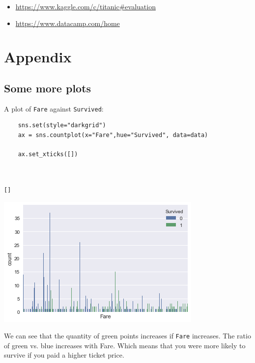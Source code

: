 \documentclass[11pt]{article}
\begin{document}
\printbibliography
\begin{itemize}
\item \url{https://www.kaggle.com/c/titanic\#evaluation}
\item \url{https://www.datacamp.com/home}
\end{itemize}

\newpage

\newpage
\section{Appendix}
\label{sec:org0ca1a66}
\label{sec:appendix}

\subsection{Some more plots}
\label{sec:org95e605a}


A plot of \texttt{Fare} against \texttt{Survived}: 
\begin{verbatim}
    sns.set(style="darkgrid")
    ax = sns.countplot(x="Fare",hue="Survived", data=data)

    ax.set_xticks([])
    
    
\end{verbatim}

\begin{verbatim}
[]
\end{verbatim}



\begin{center}
\includegraphics[width=.9\linewidth]{obipy-resources/b207b8ecf66cdede2d5455fb7467ce47-17581m1a.png}
\end{center}

We can see that the quantity of green points increases if \texttt{Fare} increases. The ratio of green vs. blue increases with Fare. Which means that you were more likely to survive if you paid a higher ticket price. 
\end{document}

